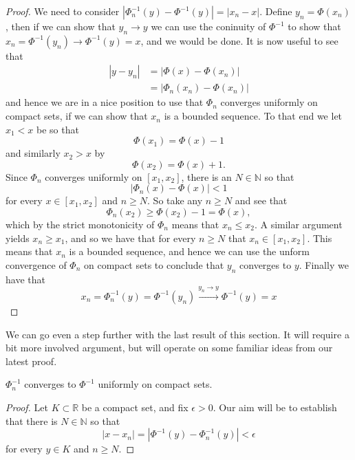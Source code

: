 \documentclass[11pt, a4paper]{article}
\begin{document}
\begin{appendix}
\begin{proof}
We need to consider $|\Phi_n^{-1}(y) - \Phi^{-1}(y)| = |x_n - x|$. Define $y_n = \Phi(x_n)$, then if we can show that $y_n \to y$ we can use the coninuity of $\Phi^{-1}$  to show that $x_n = \Phi^{-1}(y_n) \to \Phi^{-1}(y) = x$, and we would be done. It is now useful to see that
\begin{align*}
|y-y_n| &= |\Phi(x) - \Phi(x_n)| \\
	&= |\Phi_n(x_n) - \Phi(x_n)|
\end{align*}
and hence we are in a nice position to use that $\Phi_n$ converges uniformly on compact sets, if we can show that $x_n$ is a bounded sequence. To that end we let $x_1<x$ be so that
\begin{equation*}
\Phi(x_1) = \Phi(x) -1
\end{equation*}
and similarly $x_2 > x$ by
\begin{equation*}
\Phi(x_2) = \Phi(x) +1.
\end{equation*}
Since $\Phi_n$ converges uniformly on $[x_1, x_2]$, there is an $N \in \mathbb{N}$ so that
\begin{equation*}
|\Phi_n(x) - \Phi(x)| < 1
\end{equation*} 
for every $x \in [x_1, x_2]$ and $n \geq N$. So take any $n \geq N$ and see that
\begin{equation*}
\Phi_n(x_2) \geq \Phi(x_2) - 1 = \Phi(x),
\end{equation*}
which by the strict monotonicity of $\Phi_n$ means that $x_n \leq x_2$. A similar argument yields $x_n \geq x_1$, and so we have that for every $n \geq N$ that $x_n \in [x_1, x_2]$. This means that $x_n$ is a bounded sequence, and hence we can use the unform convergence of $\Phi_n$ on compact sets to conclude that $y_n$ converges to $y$. Finally we have that
\begin{equation*}
x_n = \Phi_n^{-1} (y) = \Phi^{-1}(y_n) \overset{y_n\to y}{\to} \Phi^{-1}(y) = x
\end{equation*}
\end{proof}

We can go even a step further with the last result of this section. It will require a bit more involved argument, but will operate on some familiar ideas from our latest proof.

\begin{proposition}
$\Phi_n^{-1}$ converges to $\Phi^{-1}$ uniformly on compact sets.
\end{proposition}

\begin{proof}
Let $K \subset \mathbb{R}$ be a compact set, and fix $\epsilon > 0$. Our aim will be to establish that there is $N \in \mathbb{N}$ so that 
\begin{equation*}
|x-x_n| = |\Phi^{-1}(y) - \Phi_n^{-1}(y)| < \epsilon
\end{equation*}
for every $y \in K$ and $n \geq N$. 


\end{proof}
\end{appendix}
\end{document}
